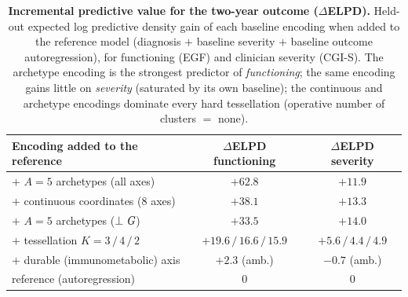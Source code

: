 \begin{table}[t]
\centering
\caption{\textbf{Incremental predictive value for the two-year outcome ($\Delta$ELPD).}
Held-out expected log predictive density gain of each baseline encoding when added to the
reference model (diagnosis $+$ baseline severity $+$ baseline outcome autoregression), for
functioning (EGF) and clinician severity (CGI-S). The archetype encoding is the strongest
predictor of \emph{functioning}; the same encoding gains little on \emph{severity} (saturated
by its own baseline); the continuous and archetype encodings dominate every hard tessellation
(operative number of clusters $=$ none).}
\label{tab:incremental}
\small
\renewcommand{\arraystretch}{1.15}
\begin{tabular}{@{}l c c@{}}
\toprule
Encoding added to the reference & $\Delta$ELPD functioning & $\Delta$ELPD severity \\
\midrule
$+$ $A{=}5$ archetypes (all axes)        & $\mathbf{+62.8}$ & $+11.9$ \\
$+$ continuous coordinates (8 axes)      & $+38.1$ & $+13.3$ \\
$+$ $A{=}5$ archetypes ($\perp\textit{G}$)    & $+33.5$ & $+14.0$ \\
$+$ tessellation $K=3\,/\,4\,/\,2$       & $+19.6\,/\,16.6\,/\,15.9$ & $+5.6\,/\,4.4\,/\,4.9$ \\
$+$ durable (immunometabolic) axis       & $+2.3$ (amb.) & $-0.7$ (amb.) \\
reference (autoregression)               & $0$ & $0$ \\
\bottomrule
\end{tabular}
\end{table}

